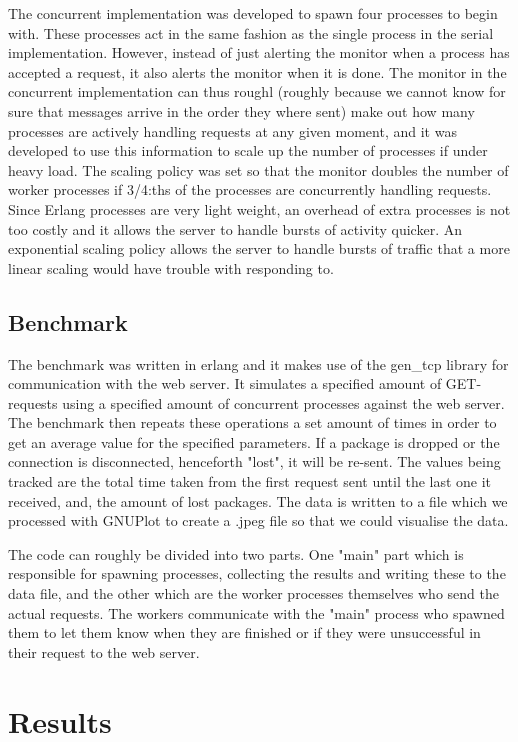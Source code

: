 \documentclass[12pt]{article}
\begin{document}
 The concurrent implementation was developed to spawn four processes to begin with. These processes act in the same fashion as the single process in the serial implementation. However, instead of just alerting the monitor when a process has accepted a request, it also alerts the monitor when it is done. The monitor in the concurrent implementation can thus roughl (roughly because we cannot know for sure that messages arrive in the order they where sent)  make out how many processes are
 actively handling requests at any given moment, and it was developed to use this information to scale up the number of processes if under heavy load. The scaling policy was set so that the monitor doubles the number of worker processes if 3/4:ths of the processes are concurrently handling requests. Since Erlang processes are very light weight, an overhead of extra processes is not too costly and it allows the server to handle bursts of activity quicker. 
An exponential scaling policy allows the server to handle bursts of traffic that a more linear scaling would have trouble with responding to. 
 \subsection{Benchmark}
 The benchmark was written in erlang and it makes use of the gen\_tcp library for communication with the web server.
 It simulates a specified amount of GET-requests using a specified amount of concurrent processes against the web server. The benchmark then repeats these operations a set amount of times in order to get an average value for the specified parameters. If a package is dropped or the connection is disconnected, henceforth "lost", it will be re-sent. The values being tracked are the total time taken from the first request sent until the last one it received, and, the amount
 of lost packages. The data is written to a file which we processed with GNUPlot to create a .jpeg file so that we could visualise the data.

 The code can roughly be divided into two parts. One "main" part which is responsible for spawning processes, collecting the results and writing these to the data file, and the other which are the worker processes themselves who send the actual requests. The workers communicate with the "main" process who spawned them to let them know when they are finished or if they were unsuccessful in their request to the web server.

 \section{Results} 
\end{document}
